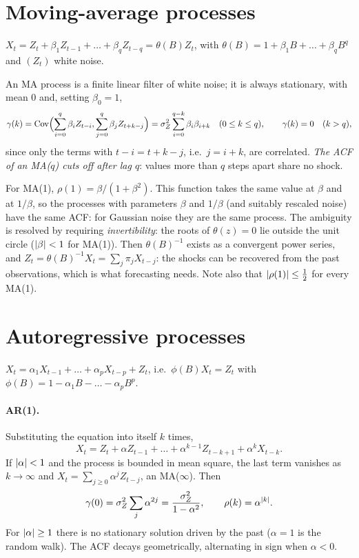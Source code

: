 \begin{notechapter}
\section{Moving-average processes}\label{linear-time-series:sec:ma}

\begin{definition}[MA($q$)]
$X_t = Z_t + \beta_1Z_{t-1} + \dots + \beta_qZ_{t-q} = \theta(B)Z_t$, with $\theta(B) = 1 + \beta_1B + \dots + \beta_qB^q$ and $(Z_t)$ white noise.
\end{definition}

An MA process is a finite linear filter of white noise; it is always stationary, with
mean $0$ and, setting $\beta_0 = 1$,
\[
  \gamma(k) = \operatorname{Cov}\Bigl(\sum_{i=0}^q\beta_iZ_{t-i}, \sum_{j=0}^q\beta_jZ_{t+k-j}\Bigr) = \sigma_Z^2\sum_{i=0}^{q-k}\beta_i\beta_{i+k}\quad(0\leq k\leq q),\qquad\gamma(k) = 0\quad(k>q),
\]
since only the terms with $t - i = t + k - j$, i.e.\ $j = i + k$, are correlated. \emph{The ACF of an
MA($q$) cuts off after lag $q$}: values more than $q$ steps apart share no shock.

For MA(1), $\rho(1) = \beta/(1 + \beta^2)$. This function takes the same value at $\beta$ and at $1/\beta$, so the
processes with parameters $\beta$ and $1/\beta$ (and suitably rescaled noise) have the same ACF: for
Gaussian noise they are the same process. The ambiguity is resolved by requiring
\emph{invertibility}: the roots of $\theta(z) = 0$ lie outside the unit circle ($\left|\beta\right|<1$ for MA(1)). Then
$\theta(B)^{-1}$ exists as a convergent power series, and
$Z_t = \theta(B)^{-1}X_t = \sum_j\pi_jX_{t-j}$: the shocks can be recovered from the past observations, which
is what forecasting needs. Note also that $\left|\rho(1)\right|\leq\frac12$ for every MA(1).

\section{Autoregressive processes}\label{linear-time-series:sec:ar}

\begin{definition}[AR($p$)]
$X_t = \alpha_1X_{t-1} + \dots + \alpha_pX_{t-p} + Z_t$, i.e.\ $\phi(B)X_t = Z_t$ with $\phi(B) = 1 - \alpha_1B - \dots - \alpha_pB^p$.
\end{definition}

\paragraph{AR(1).} Substituting the equation into itself $k$ times,
\[
  X_t = Z_t + \alpha Z_{t-1} + \dots + \alpha^{k-1}Z_{t-k+1} + \alpha^kX_{t-k} .
\]
If $\left|\alpha\right|<1$ and the process is bounded in mean square, the last term vanishes as $k\to\infty$ and
$X_t = \sum_{j\geq0}\alpha^jZ_{t-j}$, an MA($\infty$). Then
\[
  \gamma(0) = \sigma_Z^2\sum_j\alpha^{2j} = \frac{\sigma_Z^2}{1 - \alpha^2},\qquad\rho(k) = \alpha^{\left|k\right|} .
\]
For $\left|\alpha\right|\geq1$ there is no stationary solution driven by the past ($\alpha = 1$ is the random walk).
The ACF decays geometrically, alternating in sign when $\alpha<0$.


\end{notechapter}
